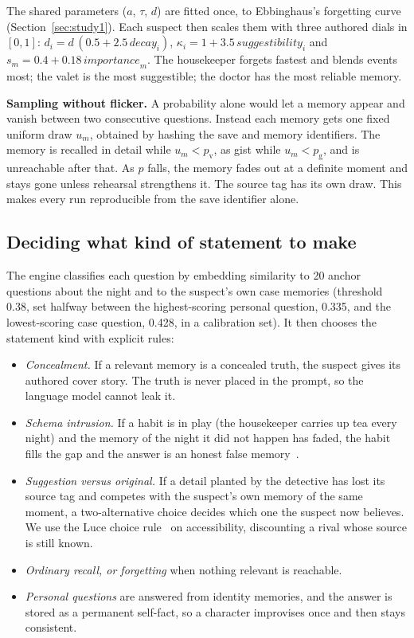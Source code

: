 \documentclass[conference]{IEEEtran}
\begin{document}
The shared parameters ($a$, $\tau$, $d$) are fitted once, to Ebbinghaus's forgetting curve
(Section~\ref{sec:study1}). Each suspect then scales them with three authored dials in $[0,1]$:
$d_i = d\,(0.5 + 2.5\,\mathit{decay}_i)$, $\kappa_i = 1 + 3.5\,\mathit{suggestibility}_i$ and
$s_m = 0.4 + 0.18\,\mathit{importance}_m$. The housekeeper forgets fastest and blends events most;
the valet is the most suggestible; the doctor has the most reliable memory.

\textbf{Sampling without flicker.} A probability alone would let a memory appear and vanish between
two consecutive questions. Instead each memory gets one fixed uniform draw $u_m$, obtained by hashing
the save and memory identifiers. The memory is recalled in detail while $u_m < p_{\mathrm{v}}$, as gist
while $u_m < p_{\mathrm{g}}$, and is unreachable after that. As $p$ falls, the memory fades out at a
definite moment and stays gone unless rehearsal strengthens it. The source tag has its own draw.
This makes every run reproducible from the save identifier alone.

\subsection{Deciding what kind of statement to make}
\label{sec:decide}
The engine classifies each question by embedding similarity to 20 anchor questions about the night
and to the suspect's own case memories (threshold 0.38, set halfway between the highest-scoring
personal question, 0.335, and the lowest-scoring case question, 0.428, in a calibration set). It then
chooses the statement kind with explicit rules:

\begin{itemize}
\item \emph{Concealment.} If a relevant memory is a concealed truth, the suspect gives its authored
cover story. The truth is never placed in the prompt, so the language model cannot leak it.
\item \emph{Schema intrusion.} If a habit is in play (the housekeeper carries up tea every night) and
the memory of the night it did not happen has faded, the habit fills the gap and the answer is an
honest false memory~\cite{bartlett1932}.
\item \emph{Suggestion versus original.} If a detail planted by the detective has lost its source tag
and competes with the suspect's own memory of the same moment, a two-alternative choice decides
which one the suspect now believes. We use the Luce choice rule~\cite{luce1959} on accessibility,
discounting a rival whose source is still known.
\item \emph{Ordinary recall, or forgetting} when nothing relevant is reachable.
\item \emph{Personal questions} are answered from identity memories, and the answer is stored as a
permanent self-fact, so a character improvises once and then stays consistent.
\end{itemize}
\end{document}
